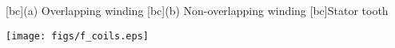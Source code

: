 \begin{psfrags}%
\psfragscanon

[bc]{(a) Overlapping winding}
[bc]{(b) Non-overlapping winding}
[bc]{Stator tooth}

\texttt{[image: figs/f\_coils.eps]}
\end{psfrags}%
